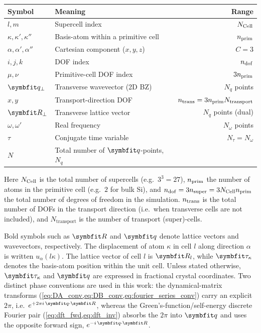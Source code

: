 \begin{center}
\begin{tabular}{llr}
  \toprule
  Symbol & Meaning & Range \\
  \midrule
  $l,m$                              & Supercell index                              & $N_{\mathrm{Cell}}$ \\
  $\kappa,\kappa',\kappa''$          & Basis-atom within a primitive cell            & $n_{\mathrm{prim}}$ \\
  $\alpha,\alpha',\alpha''$          & Cartesian component ($x,y,z$)                & $C=3$ \\
  $i, j, k$                          & DOF index                                    & $n_{\mathrm{dof}}$ \\
  $\mu, \nu$                         & Primitive-cell DOF index                     & $3n_{\mathrm{prim}}$ \\
  $\vq_\perp$                        & Transverse wavevector (2D BZ)                & $N_q$ points \\
  $x,y$                              & Transport-direction DOF                      & $n_{\mathrm{trans}} = 3n_{\mathrm{prim}} N_\mathrm{transport}$ \\
  $\vR_\perp$                        & Transverse lattice vector                    & $N_q$ points (dual) \\
  $\omega,\omega'$                   & Real frequency                               & $N_\omega$ points \\
  $\tau$                             & Conjugate time variable                      & $N_\tau = N_\omega$ \\
  $N$                                & Total number of $\vq$-points, $N_q$          & \\
  \bottomrule
\end{tabular}
\end{center}

Here $N_{\mathrm{Cell}}$ is the total number of supercells (e.g.\ $3^3 = 27$),
$n_{\mathrm{prim}}$ the number of atoms in the primitive cell (e.g.\ $2$ for
bulk Si), and
$n_{\mathrm{dof}} = 3n_{\mathrm{super}} = 3N_{\mathrm{Cell}}n_{\mathrm{prim}}$ the total number of degrees of
freedom in the simulation.  $n_{\mathrm{trans}}$ is the total number of DOFs in
the transport direction (i.e.\ when transverse cells are not
included), and $N_\mathrm{transport}$ is the number of transport
(super)-cells.

Bold symbols such as $\vR$ and $\vq$ denote lattice vectors and
wavevectors, respectively.  The displacement of atom $\kappa$ in
cell $l$ along direction $\alpha$ is written $u_\alpha(l\kappa)$.
The lattice vector of cell $l$ is $\vR_l$, while $\vc{\tau}_\kappa$
denotes the basis-atom position within the unit cell.  Unless stated
otherwise, $\vc{\tau}_\kappa$ and $\vq$ are expressed in fractional
crystal coordinates.  Two distinct phase conventions are used in this
work: the dynamical-matrix transforms
(\cref{eq:DA_conv,eq:DB_conv,eq:fourier_series_conv}) carry an explicit
$2\pi$, i.e.\ $e^{+2\pi i\,\vq\cdot\vR}$, whereas the
Green's-function/self-energy discrete Fourier pair
(\cref{eq:dft_fwd,eq:dft_inv}) absorbs the $2\pi$ into $\vq$ and uses the
opposite forward sign, $e^{-i\,\vq\cdot\vR}$.

